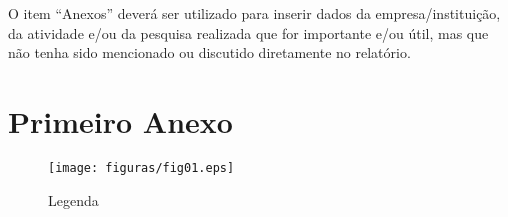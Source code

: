 \begin{anexosenv}

\partanexos

O item “Anexos” deverá ser utilizado para inserir dados da empresa/instituição, da 
atividade e/ou da pesquisa realizada que for importante e/ou útil, mas que não tenha sido 
mencionado ou discutido diretamente no relatório.

\chapter{Primeiro Anexo}
\label{appendix:anexo_certificado}
\begin{figure}
    \centering
    \texttt{[image: figuras/fig01.eps]}
    \caption{Legenda}
    \label{fig:Legenda}
\end{figure}

\end{anexosenv}


